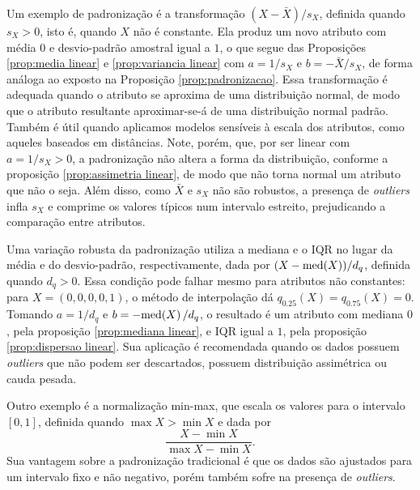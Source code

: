 Um exemplo de padronização é a transformação $(X - \bar X)/s_X$, definida quando
$s_X > 0$, isto é, quando $X$ não é constante.
Ela produz um novo atributo com média $0$ e desvio-padrão amostral igual a $1$, o que
segue das Proposições \ref{prop:media linear} e \ref{prop:variancia linear} com
$a = 1/s_X$ e $b = -\bar X/s_X$, de forma análoga ao exposto na Proposição
\ref{prop:padronizacao}.
Essa transformação é adequada quando o atributo se aproxima de uma distribuição normal,
de modo que o atributo resultante aproximar-se-á de uma distribuição normal padrão.
Também é útil quando aplicamos modelos sensíveis à escala dos atributos, como aqueles
baseados em distâncias.
Note, porém, que, por ser linear com $a = 1/s_X > 0$, a padronização não altera a forma da
distribuição, conforme a proposição \ref{prop:assimetria linear}, de modo que não torna
normal um atributo que não o seja.
Além disso, como $\bar X$ e $s_X$ não são robustos, a presença de \textit{outliers} infla
$s_X$ e comprime os valores típicos num intervalo estreito, prejudicando a comparação entre
atributos.

Uma variação robusta da padronização utiliza a mediana e o IQR no lugar da média e do
desvio-padrão, respectivamente, dada por $(X - \mathrm{med}\!\left(X\right))/d_q$, definida quando $d_q > 0$.
Essa condição pode falhar mesmo para atributos não constantes: para $X = (0, 0, 0, 0, 1)$,
o método de interpolação dá $q_{0.25}(X) = q_{0.75}(X) = 0$.
Tomando $a = 1/d_q$ e $b = -\mathrm{med}\!\left(X\right) / d_q$, o resultado é um atributo com mediana $0$,
pela proposição \ref{prop:mediana linear}, e IQR igual a $1$, pela proposição
\ref{prop:dispersao linear}.
Sua aplicação é recomendada quando os dados possuem \textit{outliers} que não podem ser
descartados, possuem distribuição assimétrica ou cauda pesada.

Outro exemplo é a normalização min-max, que escala os valores para o intervalo $[0,1]$,
definida quando $\max X > \min X$ e dada por
\[
    \frac{X - \min X}{\max X - \min X}.
\]
Sua vantagem sobre a padronização tradicional é que os dados são ajustados para um
intervalo fixo e não negativo, porém também sofre na presença de \textit{outliers}.

